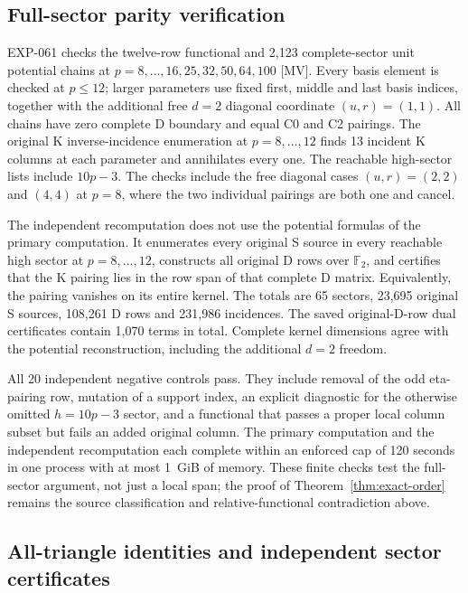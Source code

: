 \documentclass[11pt]{article}
\theoremstyle{definition}
\theoremstyle{remark}
\begin{document}
\subsection{Full-sector parity verification}

EXP-061 checks the twelve-row functional and 2,123 complete-sector unit
potential chains at $p=8,\ldots,16,25,32,50,64,100$ [MV]. Every basis
element is checked at $p\leq12$; larger parameters use fixed first,
middle and last basis indices, together with the additional free $d=2$
diagonal coordinate $(u,r)=(1,1)$. All chains have zero complete D
boundary and equal C0 and C2 pairings. The original K inverse-incidence
enumeration at $p=8,\ldots,12$ finds 13 incident K columns at each
parameter and annihilates every one. The reachable high-sector lists
include $10p-3$. The checks include the free diagonal cases $(u,r)=(2,2)$
and $(4,4)$ at $p=8$, where the two individual pairings are both one and
cancel.

The independent recomputation does not use the potential formulas of the
primary computation.
It enumerates every original S source in every reachable high sector
at $p=8,\ldots,12$, constructs all original D rows over $\mathbb F_2$,
and certifies that the K pairing lies in the row span of that complete
D matrix. Equivalently, the pairing vanishes on its entire kernel.
The totals are 65 sectors, 23,695 original S sources, 108,261 D rows
and 231,986 incidences. The saved original-D-row dual certificates
contain 1,070 terms in total. Complete kernel dimensions agree with
the potential reconstruction, including the additional $d=2$ freedom.

All 20 independent negative controls pass. They include removal of the
odd eta-pairing row, mutation of a support index, an explicit diagnostic
for the otherwise omitted $h=10p-3$ sector, and a functional that passes
a proper local column subset but fails an added original column. The
primary computation and the independent recomputation each complete within an enforced cap of
120 seconds in one process with at most 1~GiB of memory. These finite
checks test the
full-sector argument, not just a local span; the proof of
Theorem~\ref{thm:exact-order} remains the source classification and
relative-functional contradiction above.

\subsection{All-triangle identities and independent sector certificates}
\end{document}
